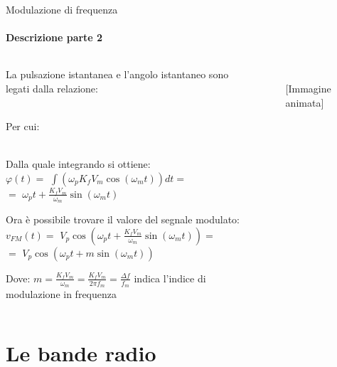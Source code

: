 \documentclass[aspectratio=169]{beamer}
\begin{document}
\begin{frame}{Modulazione di frequenza}
	\framesubtitle{Descrizione parte 2}
	
		\begin{columns}
		\begin{column}{0.6\textwidth}
			La pulsazione istantanea e l'angolo istantaneo sono legati dalla relazione:\\
			\\
			\raggedright{Per cui:}\\
			\\
			\smallskip
			\raggedright{Dalla quale integrando si ottiene:}\\
			\smallskip
			\centering
			\textcolor{red!80}{$\varphi(t) = $} $\int(\omega_{p} K_{f} V_{m} \cos(\omega_{m}t))dt =$\\
			\smallskip
			$=$ \textcolor{red!80}{$\omega_{p}t + \frac{K_{f} V_{m}}{\omega_{m}} \sin(\omega_{m}t)$}\\
			\smallskip
			\raggedright{Ora è possibile trovare il valore del segnale modulato:}\\
			\smallskip
			\centering
			\textcolor{red!80}{$v_{FM}(t) = $} $V_{p} \cos(\omega_{p}t+\frac{K_{f} V_{m}}{\omega_{m}}\sin(\omega_{m}t)) =$\\
			\smallskip
			$=$ \textcolor{red!80}{$V_{p}\cos(\omega_{p}t + m\sin(\omega_{m}t))$}\\
			\smallskip
			\raggedright{Dove: $m = \frac{K_{f} V_{m}}{\omega_{m}} = \frac{K_{f} V_{m}}{2\pi f_{m}} = \frac{\varDelta f}{f_{m}}$ indica l'indice di modulazione in frequenza}
			
		\end{column}
		\begin{column}{0.4\textwidth}
			\begin{figure}
				\raggedright
				\\
				\qquad \qquad \tiny {\textcolor{gray!80}{[Immagine animata]}}
			\end{figure}
		\end{column}
	\end{columns}
	
\end{frame}

\section{Le bande radio}
\begin{frame}
	\\
\end{frame}
\end{document}
